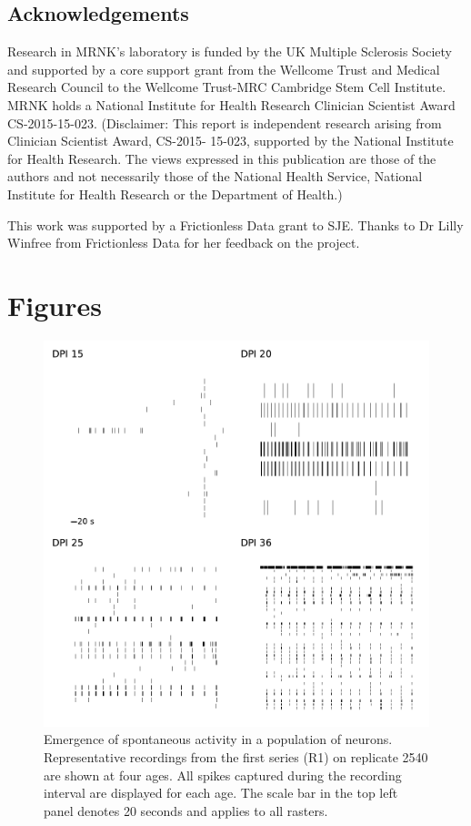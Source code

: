 \documentclass[doublespacing]{bmcart}
\begin{document}
\begin{backmatter}

\subsection*{Acknowledgements}
\par ﻿Research in MRNK's laboratory is funded by the UK Multiple Sclerosis
Society and supported by a core support grant from the Wellcome Trust
and Medical Research Council to the Wellcome Trust-MRC Cambridge Stem
Cell Institute. MRNK holds a National Institute for Health Research
Clinician Scientist Award CS-2015-15-023. (Disclaimer: This report is
independent research arising from Clinician Scientist Award, CS-2015-
15-023, supported by the National Institute for Health Research. The
views expressed in this publication are those of the authors and not
necessarily those of the National Health Service, National Institute for
Health Research or the Department of Health.)

\par This work was supported by a Frictionless Data grant to SJE\@.
Thanks to Dr Lilly Winfree from Frictionless Data for her feedback on
the project.





\clearpage
\section*{Figures}
\begin{figure}[h!]
  \includegraphics{../plots/supplementary_figures/raster_plots.pdf}
  \caption{Emergence of spontaneous activity in a population of neurons. Representative recordings from the first series (R1) on replicate 2540 are shown at four ages. All spikes captured during the recording interval are displayed for each age.  The scale bar in the top left panel denotes 20 seconds and applies to all rasters.}
  \label{fig:rasters}
\end{figure}


\end{backmatter}
\end{document}
